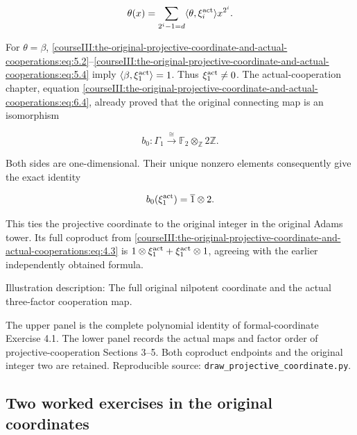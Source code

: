 \begin{equation}
\theta(x)=\sum_{2^i-1=d}\langle\theta,\xi_i^{\rm act}\rangle x^{2^i}.
 \label{courseIII:the-original-projective-coordinate-and-actual-cooperations:eq:5.4}
\end{equation}

For \(\theta=\beta\), \eqref{courseIII:the-original-projective-coordinate-and-actual-cooperations:eq:5.2}--\eqref{courseIII:the-original-projective-coordinate-and-actual-cooperations:eq:5.4} imply
\(\langle\beta,\xi_1^{\rm act}\rangle=1\). Thus \(\xi_1^{\rm act}\neq0\). The actual-cooperation chapter, equation \eqref{courseIII:the-original-projective-coordinate-and-actual-cooperations:eq:6.4}, already proved that the original connecting map is an isomorphism

\begin{equation}
b_0:\Gamma_1\xrightarrow{\cong}\mathbb F_2\otimes_{\mathbb Z}2\mathbb Z.
 \label{courseIII:the-original-projective-coordinate-and-actual-cooperations:eq:5.5}
\end{equation}

Both sides are one-dimensional. Their unique nonzero elements consequently give the exact identity

\begin{equation}
b_0(\xi_1^{\rm act})=\overline1\otimes2.
 \label{courseIII:the-original-projective-coordinate-and-actual-cooperations:eq:5.6}
\end{equation}

This ties the projective coordinate to the original integer in the original Adams tower. Its full coproduct from \eqref{courseIII:the-original-projective-coordinate-and-actual-cooperations:eq:4.3} is \(1\otimes\xi_1^{\rm act}+\xi_1^{\rm act}\otimes1\), agreeing with the earlier independently obtained formula.

Illustration description: The full original nilpotent coordinate and the actual three-factor cooperation map.

The upper panel is the complete polynomial identity of formal-coordinate Exercise 4.1. The lower panel records the actual maps and factor order of projective-cooperation Sections 3--5. Both coproduct endpoints and the original integer two are retained. Reproducible source: \texttt{draw\_projective\_coordinate.py}.

\subsection{Two worked exercises in the original coordinates}
\label{courseIII:the-original-projective-coordinate-and-actual-cooperations:projective-worked-exercises}

